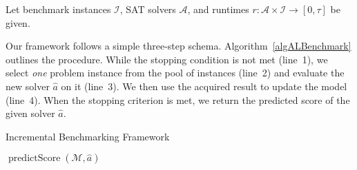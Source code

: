\documentclass[runningheads]{llncs}
\begin{document}
Let benchmark instances $\mathcal{I}$, SAT solvers $\mathcal{A}$, and runtimes $r\!: \mathcal{A} \times \mathcal{I} \rightarrow \left[0, \tau\right]$ be given. 

Our framework follows a simple three-step schema.
Algorithm~\ref{algALBenchmark} outlines the procedure. 
While the stopping condition is not met (line~1), we select \emph{one} problem instance from the pool of instances (line~2) and evaluate the new solver $\hat{a}$ on it (line~3).
We then use the acquired result to update the model (line~4).
When the stopping criterion is met, we return the predicted score of the given solver $\hat{a}$.

\begin{algorithm}
  \caption{Incremental Benchmarking Framework}
  \label{algALBenchmark}


  \BlankLine


  
  \Return $\operatorname{predictScore}\!\left(\mathcal{M}, \hat{a}\right)$

\end{algorithm}
\end{document}
